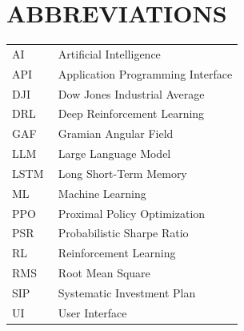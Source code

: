 \chapter*{ABBREVIATIONS}


\begin{tabular}{p{0.2\linewidth}p{0.8\linewidth}}
    AI   & Artificial Intelligence \\
    API  & Application Programming Interface \\
    DJI  & Dow Jones Industrial Average \\
    DRL  & Deep Reinforcement Learning \\
    GAF  & Gramian Angular Field \\
    LLM  & Large Language Model \\
    LSTM & Long Short-Term Memory \\
    ML   & Machine Learning \\
    PPO  & Proximal Policy Optimization \\
    PSR  & Probabilistic Sharpe Ratio \\
    RL   & Reinforcement Learning \\
    RMS  & Root Mean Square \\
    SIP  & Systematic Investment Plan \\
    UI   & User Interface \\
\end{tabular}
